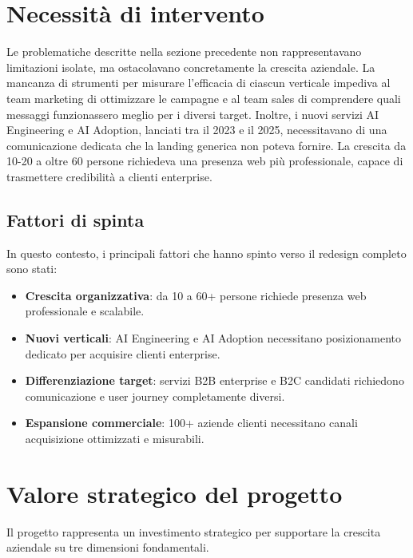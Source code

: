 \section{Necessità di intervento}
Le problematiche descritte nella sezione precedente non rappresentavano 
limitazioni isolate, ma ostacolavano concretamente la crescita aziendale. 
La mancanza di strumenti per misurare l'efficacia di ciascun verticale 
impediva al team marketing di ottimizzare le campagne e al team sales 
di comprendere quali messaggi funzionassero meglio per i diversi target. 
Inoltre, i nuovi servizi AI Engineering e AI Adoption, lanciati tra il 
2023 e il 2025, necessitavano di una comunicazione dedicata che la 
landing generica non poteva fornire. La crescita da 10-20 a oltre 60 
persone richiedeva una presenza web più professionale, capace di 
trasmettere credibilità a clienti enterprise.

\subsection{Fattori di spinta}
In questo contesto, i principali fattori che hanno spinto verso il 
redesign completo sono stati:

\begin{itemize}
  \item \textbf{Crescita organizzativa}: da 10 a 60+ persone 
        richiede presenza web professionale e scalabile.
  
  \item \textbf{Nuovi verticali}: AI Engineering e AI Adoption 
        necessitano posizionamento dedicato per acquisire clienti 
        enterprise.
  
  \item \textbf{Differenziazione target}: servizi B2B enterprise e 
        B2C candidati richiedono comunicazione e user journey 
        completamente diversi.
  
  \item \textbf{Espansione commerciale}: 100+ aziende clienti 
    necessitano canali acquisizione ottimizzati e misurabili.
\end{itemize}

\section{Valore strategico del progetto}
Il progetto rappresenta un investimento strategico per supportare la 
crescita aziendale su tre dimensioni fondamentali.

